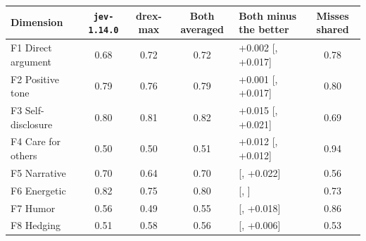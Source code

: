 {\footnotesize
\begin{tabular}{@{}l ccc l c@{}}
\toprule
Dimension & \texttt{jev-1.14.0} & drex-max & Both averaged & Both minus the better & Misses shared \\
\midrule
F1 Direct argument & 0.68 & 0.72 & 0.72 & +0.002 {\scriptsize[\textminus 0.023, +0.017]} & 0.78 \\
F2 Positive tone & 0.79 & 0.76 & 0.79 & +0.001 {\scriptsize[\textminus 0.018, +0.017]} & 0.80 \\
F3 Self-disclosure & 0.80 & 0.81 & 0.82 & +0.015 {\scriptsize[\textminus 0.006, +0.021]} & 0.69 \\
F4 Care for others & 0.50 & 0.50 & 0.51 & +0.012 {\scriptsize[\textminus 0.031, +0.012]} & 0.94 \\
F5 Narrative & 0.70 & 0.64 & 0.70 & \textminus 0.001 {\scriptsize[\textminus 0.027, +0.022]} & 0.56 \\
F6 Energetic & 0.82 & 0.75 & 0.80 & \textminus 0.019 {\scriptsize[\textminus 0.034, \textminus 0.004]} & 0.73 \\
F7 Humor & 0.56 & 0.49 & 0.55 & \textminus 0.011 {\scriptsize[\textminus 0.049, +0.018]} & 0.86 \\
F8 Hedging & 0.51 & 0.58 & 0.56 & \textminus 0.020 {\scriptsize[\textminus 0.049, +0.006]} & 0.53 \\
\bottomrule
\end{tabular}}
